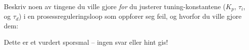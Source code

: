 

Beskriv noen av tingene du ville gjore {\it for} du justerer tuning-konstantene ($K_p$, $\tau_i$, og $\tau_d$) i en prosessreguleringsloop som oppforer seg feil, og hvorfor du ville gjore dem:

\vfil

\eject






Dette er et vurdert sporsmal -- ingen svar eller hint gis!











